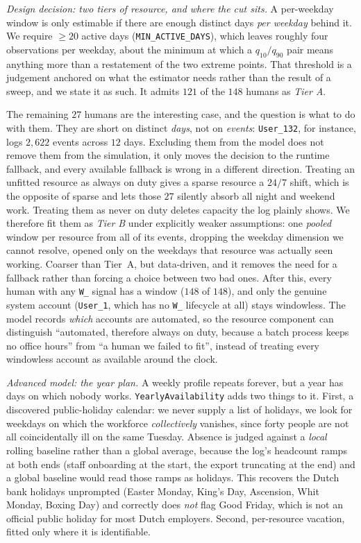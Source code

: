 \emph{Design decision: two tiers of resource, and where the cut sits.} A
per-weekday window is only estimable if there are enough distinct days
\emph{per weekday} behind it. We require $\geq 20$ active days
(\texttt{MIN\_ACTIVE\_DAYS}), which leaves roughly four observations per
weekday, about the minimum at which a $q_{10}/q_{90}$ pair means anything more
than a restatement of the two extreme points. That threshold is a judgement
anchored on what the estimator needs rather than the result of a sweep, and we
state it as such. It admits $121$ of the $148$ humans as \emph{Tier A}.

The remaining $27$ humans are the interesting case, and the question is what to
do with them. They are short on distinct \emph{days}, not on \emph{events}:
\texttt{User\_132}, for instance, logs $2{,}622$ events across $12$ days.
Excluding them from the model does not remove them from the simulation, it only
moves the decision to the runtime fallback, and every available fallback is
wrong in a different direction. Treating an unfitted resource as always on duty
gives a sparse resource a $24/7$ shift, which is the opposite of sparse and
lets those $27$ silently absorb all night and weekend work. Treating them as
never on duty deletes capacity the log plainly shows. We therefore fit them as
\emph{Tier B} under explicitly weaker assumptions: one \emph{pooled} window per
resource from all of its events, dropping the weekday dimension we cannot
resolve, opened only on the weekdays that resource was actually seen working.
Coarser than Tier~A, but data-driven, and it removes the need for a fallback
rather than forcing a choice between two bad ones. After this, every human with
any \texttt{W\_} signal has a window ($148$ of $148$), and only the genuine
system account (\texttt{User\_1}, which has no \texttt{W\_} lifecycle at all)
stays windowless. The model records \emph{which} accounts are automated, so the
resource component can distinguish ``automated, therefore always on duty,
because a batch process keeps no office hours'' from ``a human we failed to
fit'', instead of treating every windowless account as available around the
clock.

\emph{Advanced model: the year plan.} A weekly profile repeats forever, but a
year has days on which nobody works. \texttt{YearlyAvailability} adds two
things to it. First, a discovered public-holiday calendar: we never supply a
list of holidays, we look for weekdays on which the workforce
\emph{collectively} vanishes, since forty people are not all coincidentally ill
on the same Tuesday. Absence is judged against a \emph{local} rolling baseline
rather than a global average, because the log's headcount ramps at both ends
(staff onboarding at the start, the export truncating at the end) and a global
baseline would read those ramps as holidays. This recovers the Dutch bank
holidays unprompted (Easter Monday, King's Day, Ascension, Whit Monday, Boxing
Day) and correctly does \emph{not} flag Good Friday, which is not an official
public holiday for most Dutch employers. Second, per-resource vacation, fitted
only where it is identifiable.

